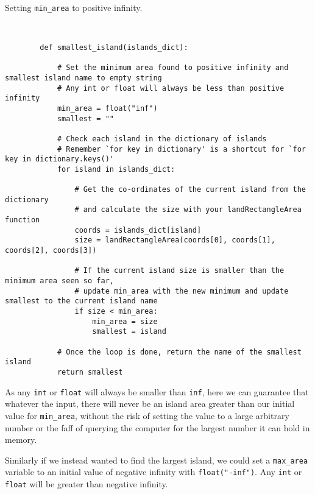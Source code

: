 \documentclass[a4paper]{article}
\begin{document}
\begin{listing}[H]
    \caption[]{Setting \texttt{min\_area} to positive infinity.}
    \label{list:infinity}
    \begin{verbatim}


        def smallest_island(islands_dict):

            # Set the minimum area found to positive infinity and smallest island name to empty string
            # Any int or float will always be less than positive infinity
            min_area = float("inf")
            smallest = ""

            # Check each island in the dictionary of islands
            # Remember `for key in dictionary' is a shortcut for `for key in dictionary.keys()'
            for island in islands_dict:

                # Get the co-ordinates of the current island from the dictionary
                # and calculate the size with your landRectangleArea function
                coords = islands_dict[island]
                size = landRectangleArea(coords[0], coords[1], coords[2], coords[3])

                # If the current island size is smaller than the minimum area seen so far,
                # update min_area with the new minimum and update smallest to the current island name
                if size < min_area:
                    min_area = size
                    smallest = island

            # Once the loop is done, return the name of the smallest island
            return smallest

    \end{verbatim}
\end{listing}

As any \texttt{int} or \texttt{float} will always be smaller than \texttt{inf},
here we can guarantee that whatever the input, there will never be an island area greater than
our initial value for \texttt{min\_area}, without the risk of setting the value to
a large arbitrary number or the faff of querying the computer for the largest number it can
hold in memory.

Similarly if we instead wanted to find the largest island, we could set a \texttt{max\_area}
variable to an initial value of negative infinity with \texttt{float("-inf")}. Any \texttt{int}
or \texttt{float} will be greater than negative infinity.
\end{document}
